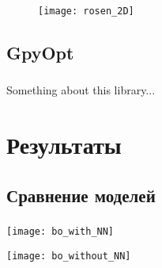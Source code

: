 \documentclass[t]{beamer}
\begin{document}
\begin{frame}
\frametitle{\insertsection}
\framesubtitle{\insertsubsection}
\begin{figure}[H]
	\centering
	\texttt{[image: rosen\_2D]} 
\end{figure}


\end{frame}


\subsection{GpyOpt}

\begin{frame}
\frametitle{\insertsection}
\framesubtitle{\insertsubsection}

Something about this library...

\end{frame}



\section{Результаты}

\subsection{Сравнение моделей}

\begin{frame}
\frametitle{\insertsection}
\framesubtitle{\insertsubsection}
\begin{center}
\texttt{[image: bo\_with\_NN]}
\end{center}
\begin{center}
\texttt{[image: bo\_without\_NN]}
\end{center}

\end{frame}

\end{document}
